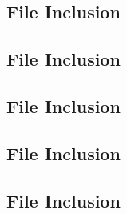 \documentclass[11pt]{article}
\newcommand{\Verilog}[2][]{%
	
}
\begin{document}
\subsection*{File Inclusion}
\Verilog[caption=Half Adder Test Benches Verilog code,label=code:file_ex]{halfadder_test.sv}

\subsection*{File Inclusion}
\Verilog[caption=Full Adder Verilog code,label=code:file_ex]{fulladder.sv}

\subsection*{File Inclusion}
\Verilog[caption=Full Adder Test Benches Verilog code,label=code:file_ex]{fulladder_test.sv}

\subsection*{File Inclusion}
\Verilog[caption=Two Bit Adder/Aubtractor Verilog code,label=code:file_ex]{addsub.sv}

\subsection*{File Inclusion}
\Verilog[caption=Two Bit Adder/Aubtractor Test Benches Verilog code,label=code:file_ex]{addsub_test.sv}
\end{document}
